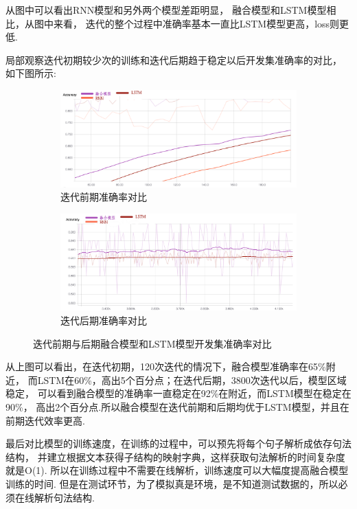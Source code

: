 \documentclass[bachelor,winfonts]{jnuthesis}
\begin{document}
从图中可以看出RNN模型和另外两个模型差距明显，
融合模型和LSTM模型相比，从图中来看，
迭代的整个过程中准确率基本一直比LSTM模型更高，loss则更低.

局部观察迭代初期较少次的训练和迭代后期趋于稳定以后开发集准确率的对比，
如下图所示:

\begin{figure}[h!]
  \centering
  \begin{subfigure}[b]{0.8\linewidth}
    \includegraphics[width=\linewidth]{基本-准确率初期.png}
    \caption{迭代前期准确率对比}
  \end{subfigure}
  \begin{subfigure}[b]{0.8\linewidth}
    \includegraphics[width=\linewidth]{基本-准确率后期.png}
    \caption{迭代后期准确率对比}
  \end{subfigure}
  \caption{迭代前期与后期融合模型和LSTM模型开发集准确率对比}
\end{figure}

从上图可以看出，在迭代初期，120次迭代的情况下，融合模型准确率在65\%附近，
而LSTM在60\%，高出5个百分点；在迭代后期，3800次迭代以后，模型区域稳定，
可以看到融合模型的准确率一直稳定在92\%在附近，而LSTM模型在稳定在90\%，
高出2个百分点.所以融合模型在迭代前期和后期均优于LSTM模型，并且在前期迭代效率更高.

最后对比模型的训练速度，在训练的过程中，可以预先将每个句子解析成依存句法结构，
并建立根据文本获得子结构的映射字典，这样获取句法解析的时间复杂度就是O(1).
所以在训练过程中不需要在线解析，训练速度可以大幅度提高融合模型训练的时间.
但是在测试环节，为了模拟真是环境，是不知道测试数据的，所以必须在线解析句法结构.
\end{document}
